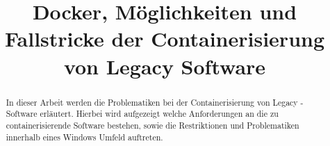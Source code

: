\documentclass[10pt,conference,a4paper]{IEEEtran}
\begin{document}
\title{Docker, Möglichkeiten und Fallstricke der Containerisierung von Legacy Software}

\author{%
}

\maketitle

\pagestyle{plain}

\maketitle

\begin{abstract}
	In dieser Arbeit werden die Problematiken bei der Containerisierung von Legacy - Software erläutert. Hierbei wird aufgezeigt welche Anforderungen an die zu containerisierende Software bestehen, sowie die Restriktionen und Problematiken innerhalb eines Windows Umfeld auftreten.
\end{abstract}








\end{document}
